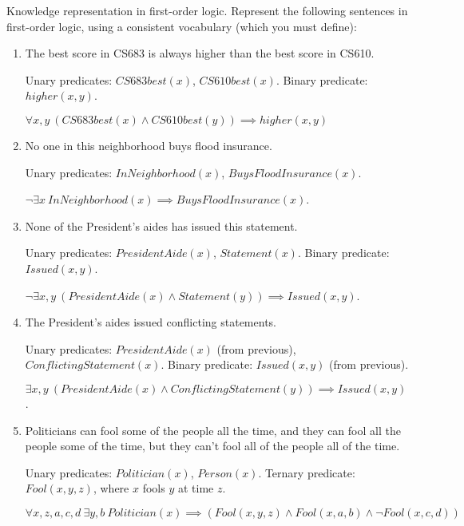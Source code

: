 \documentclass[12pt]{article}
\newenvironment{problem}[2][Problem]{\begin{trivlist}
\item[\hskip \labelsep {\bfseries #1}\hskip \labelsep {\bfseries #2.}]}{\end{trivlist}}
\begin{document}
\begin{problem}{3}
	Knowledge representation in first-order logic.
	Represent the following sentences in first-order logic, using a consistent vocabulary (which you must define):
	\begin{enumerate}
		\item The best score in CS683 is always higher than the best score in CS610.

			\vspace{0.25cm}
			Unary predicates: $CS683best(x)$, $CS610best(x)$.
			Binary predicate: $higher(x,y)$.

			$\forall x,y ~ \left(CS683best(x) \wedge CS610best(y)\right) \implies higher(x,y)$
		\item No one in this neighborhood buys flood insurance.

			\vspace{0.25cm}
			Unary predicates: $InNeighborhood(x)$, $BuysFloodInsurance(x)$.

			$\neg \exists x ~ InNeighborhood(x) \implies BuysFloodInsurance(x)$.
		\item None of the President's aides has issued this statement.

			\vspace{0.25cm}
			Unary predicates: $PresidentAide(x)$, $Statement(x)$.
			Binary predicate: $Issued(x,y)$.

			$\neg \exists x,y ~ \left(PresidentAide(x) \wedge Statement(y)\right) \implies Issued(x,y)$.
		\item The President's aides issued conflicting statements.

			\vspace{0.25cm}
			Unary predicates: $PresidentAide(x)$ (from previous), $ConflictingStatement(x)$.
			Binary predicate: $Issued(x,y)$ (from previous).

			$\exists x,y ~ \left(PresidentAide(x) \wedge ConflictingStatement(y)\right) \implies Issued(x,y)$.
		\item Politicians can fool some of the people all the time, and they can fool all the people some of the time, but they can't fool all of the people all of the time.

			\vspace{0.25cm}
			Unary predicates: $Politician(x)$, $Person(x)$.
			Ternary predicate: $Fool(x,y,z)$, where $x$ fools $y$ at time $z$.

			$\forall x,z,a,c,d ~ \exists y,b ~ Politician(x) \implies \left(Fool(x,y,z) \wedge Fool(x,a,b) \wedge \neg Fool(x,c,d)\right)$
	\end{enumerate}
\end{problem}
\end{document}
